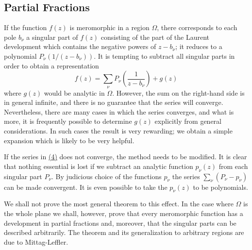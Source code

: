 \setcounter{section}{2}\setcounter{subsection}{0}\subsection{Partial Fractions}\label{sec:5.2.1}
If the function $f(z)$ is meromorphic in a region $\Omega$, there corresponds to each pole $b_{\nu}$ a singular part of $f(z)$ consisting of the part of the Laurent development which contains the negative powers of $z - b_{\nu}$; it reduces to a polynomial $P_{\nu}(1/(z - b_{\nu}))$. It is tempting to subtract all singular parts in order to obtain a representation
\begin{equation*}
f (z) = \sum_ {\nu} P _ {\nu} \left(\frac {1}{z - b _ {\nu}}\right) + g (z)\tag{4}\label{eq:5.4}
\end{equation*}
where $g(z)$ would be analytic in $\Omega$. However, the sum on the right-hand side is in general infinite, and there is no guarantee that the series will converge. Nevertheless, there are many cases in which the series converges, and what is more, it is frequently possible to determine $g(z)$ explicitly from general considerations. In such cases the result is very rewarding; we obtain a simple expansion which is likely to be very helpful.

If the series in \hyperref[eq:5.4]{(4)} does not converge, the method needs to be modified. It is clear that nothing essential is lost if we subtract an analytic function $p_{\nu}(z)$ from each singular part $P_{\nu}$. By judicious choice of the functions $p_{\nu}$ the series $\sum_{\nu}(P_{\nu}-p_{\nu})$ can be made convergent. It is even possible to take the $p_{\nu}(z)$ to be polynomials.

We shall not prove the most general theorem to this effect. In the case where $\Omega$ is the whole plane we shall, however, prove that every meromorphic function has a development in partial fractions and, moreover, that the singular parts can be described arbitrarily. The theorem and its generalization to arbitrary regions are due to Mittag-Leffler.

